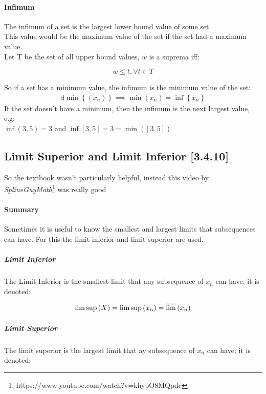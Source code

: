 \documentclass[class=article, crop=false]{standalone}
\begin{document}
\paragraph{Infimum}
The infimum of a set is the largest lower bound value of some set. \\
This value would be the maximum value of the set if the set had a maximum value.\\
Let T be the set of all upper bound values, $w$ is a suprema iff:

\begin{equation}
  w \leq t, \forall t \in T 
  \label{infdef}
\end{equation}

So if a set has a minimum value, the infimum is the minimum value of the set:
\begin{align}
  \exists \min\left\{ \left( x_n \right) \right\} \implies \min(x_n) = \inf \left\{ x_n \right\}
  \label{minassup}
\end{align}
If the set doesn't have a minimum, then the infimum is the next largest value, e.g.\\
$\inf \left( 3, 5 \right) = 3$ and $\inf \left[ 3, 5 \right] = 3 = \min \left( \left[ 3, 5 \right] \right)$  

\subsection{Limit Superior and Limit Inferior [3.4.10]}
So the textbook wasn't particularly helpful, instead this video by \textit{SplineGuyMath}\footnote{https://www.youtube.com/watch?v=khypO8MQpdc} was really good

\paragraph{Summary}
Sometimes it is useful to know the smallest and largest limits that subsequences can have. For this the limit inferior and limit superior are used.
\subparagraph{Limit Inferior}
The Limit Inferior is the smallest limit that any subsequence of $x_n$ can have; it is denoted:

\begin{align}
  \limsup \left( X \right) = \limsup \left( x_n \right) = \varlimsup \left( x_n \right) %
  \label{limsupnotdef}
\end{align}
\subparagraph{Limit Superior} 
The limit superior is the largest limit that ay subsequence of $x_n$ can have; it is denoted:
\end{document}
